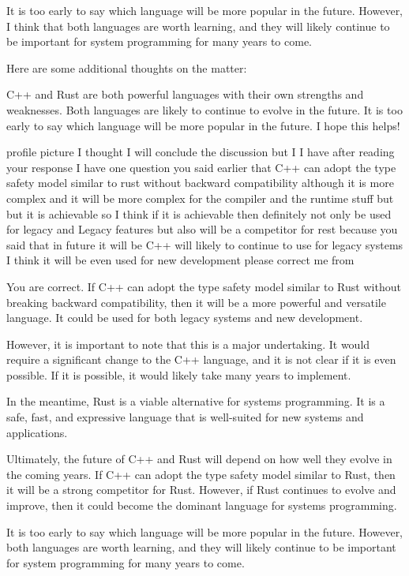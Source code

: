 \documentclass[11pt]{article}
\begin{document}
It is too early to say which language will be more popular in the future. However, I think that both languages are worth learning, and they will likely continue to be important for system programming for many years to come.

Here are some additional thoughts on the matter:

C++ and Rust are both powerful languages with their own strengths and weaknesses.
Both languages are likely to continue to evolve in the future.
It is too early to say which language will be more popular in the future.
I hope this helps!

profile picture
I thought I will conclude the discussion but I I have after reading your
response I have one question you said earlier that C++
can adopt the type safety model similar to rust without
backward compatibility
although it is more complex and it will be more complex for the compiler and
the runtime stuff but but it is achievable so I think if it is achievable then
definitely not only be used for legacy and
Legacy features but also will be a competitor for rest
because you said that
in future it will be
C++ will likely to continue to use for legacy systems
I think
it will be even used for new development please correct me from

You are correct. If C++ can adopt the type safety model similar to Rust without breaking backward compatibility, then it will be a more powerful and versatile language. It could be used for both legacy systems and new development.

However, it is important to note that this is a major undertaking. It would require a significant change to the C++ language, and it is not clear if it is even possible. If it is possible, it would likely take many years to implement.

In the meantime, Rust is a viable alternative for systems programming. It is a safe, fast, and expressive language that is well-suited for new systems and applications.

Ultimately, the future of C++ and Rust will depend on how well they evolve in the coming years. If C++ can adopt the type safety model similar to Rust, then it will be a strong competitor for Rust. However, if Rust continues to evolve and improve, then it could become the dominant language for systems programming.

It is too early to say which language will be more popular in the future. However, both languages are worth learning, and they will likely continue to be important for system programming for many years to come.
\end{document}
